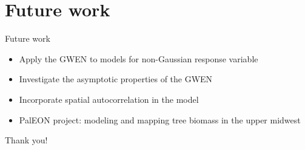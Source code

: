 \documentclass[12pt,t]{beamer}
\begin{document}
\section{Future work}


\begin{frame}{Future work}
\begin{itemize}
  \item Apply the GWEN to models for non-Gaussian response variable
  \item Investigate the asymptotic properties of the GWEN
  \item Incorporate spatial autocorrelation in the model
  \item PalEON project: modeling and mapping tree biomass in the upper midwest
\end{itemize}
\end{frame}



\begin{frame}{Thank you!}

\end{frame}
\end{document}

